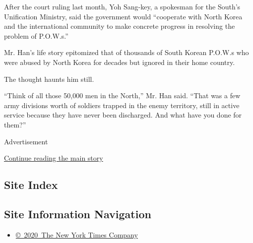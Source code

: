 After the court ruling last month, Yoh Sang-key, a spokesman for the
South's Unification Ministry, said the government would ``cooperate with
North Korea and the international community to make concrete progress in
resolving the problem of P.O.W.s.''

Mr. Han's life story epitomized that of thousands of South Korean
P.O.W.s who were abused by North Korea for decades but ignored in their
home country.

The thought haunts him still.

``Think of all those 50,000 men in the North,'' ​Mr. Han said. ``That
was a few army divisions worth of soldiers trapped in the enemy
territory, still in active service because they have never been
discharged. And what have you done for them?''

Advertisement

\protect\hyperlink{after-bottom}{Continue reading the main story}

\hypertarget{site-index}{%
\subsection{Site Index}\label{site-index}}

\hypertarget{site-information-navigation}{%
\subsection{Site Information
Navigation}\label{site-information-navigation}}

\begin{itemize}
\tightlist
\item
  \href{https://help.nytimes.com/hc/en-us/articles/115014792127-Copyright-notice}{©~2020~The
  New York Times Company}
\end{itemize}

